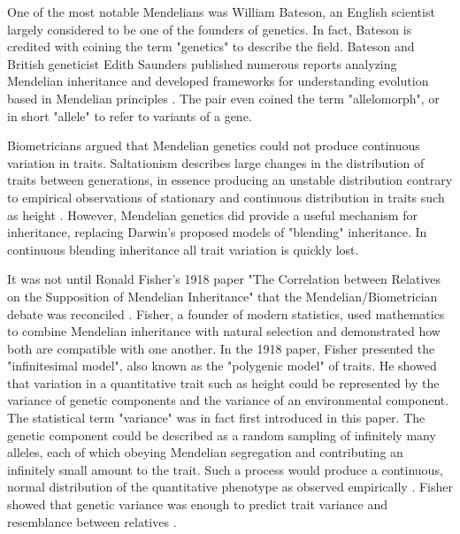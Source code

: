 One of the most notable Mendelians was William Bateson, an English scientist largely considered to be one of the founders of genetics. In fact, Bateson is credited with coining the term "genetics" to describe the field. Bateson and British geneticist Edith Saunders published numerous reports analyzing Mendelian inheritance and developed frameworks for understanding evolution based in Mendelian principles \cite{bateson_reports_1902}. The pair even coined the term "allelomorph", or in short "allele" to refer to variants of a gene.  

Biometricians argued that Mendelian genetics could not produce continuous variation in traits. Saltationism describes large changes in the distribution of traits between generations, in essence producing an unstable distribution contrary to empirical observations of stationary and continuous distribution in traits such as height \cite{ahearn_height_2009}. However, Mendelian genetics did provide a useful mechanism for inheritance, replacing Darwin's proposed models of "blending" inheritance. In continuous blending inheritance all trait variation is quickly lost.  

It was not until Ronald Fisher's 1918 paper "The Correlation between Relatives on the Supposition of Mendelian Inheritance" \cite{fisher_1918} that the Mendelian/Biometrician debate was reconciled \cite{visscher_r.._2019}. Fisher, a founder of modern statistics, used mathematics to combine Mendelian inheritance with natural selection and demonstrated how both are compatible with one another. In the 1918 paper, Fisher presented the "infinitesimal model", also known as the "polygenic model" of traits. He showed that variation in a quantitative trait such as height could be represented by the variance of genetic components and the variance of an environmental component. The statistical term "variance" was in fact first introduced in this paper. The genetic component could be described as a random sampling of infinitely many alleles, each of which obeying Mendelian segregation and contributing an infinitely small amount to the trait. Such a process would produce a continuous, normal distribution of the quantitative phenotype as observed empirically \cite{boyle_expanded_2017}. Fisher showed that genetic variance was enough to predict trait variance and resemblance between relatives \cite{visscher_r.._2019}.

